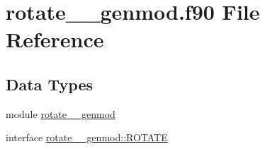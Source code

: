 \hypertarget{rotate____genmod_8f90}{\section{rotate\+\_\+\+\_\+genmod.\+f90 File Reference}
\label{rotate____genmod_8f90}
}
\subsection*{Data Types}
\begin{DoxyCompactItemize}
\item 
module \hyperlink{classrotate____genmod}{rotate\+\_\+\+\_\+genmod}
\item 
interface \hyperlink{interfacerotate____genmod_1_1ROTATE}{rotate\+\_\+\+\_\+genmod\+::\+R\+O\+T\+A\+T\+E}
\end{DoxyCompactItemize}
